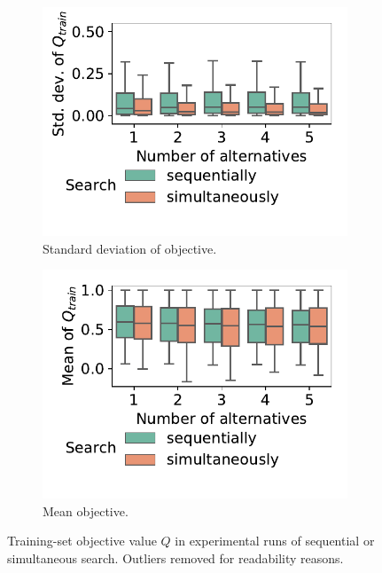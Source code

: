 \documentclass{article}
\theoremstyle{definition}
\begin{document}
\begin{figure}[htb]
	\centering
	\begin{subfigure}{0.48\textwidth}
		\centering
		\includegraphics[width=\textwidth]{plots/impact-search-stddev-objective.pdf}
		\caption{Standard deviation of objective.}
		\label{fig:impact-search-stddev-objective}
	\end{subfigure}
	\hfill
	\begin{subfigure}{0.48\textwidth}
		\centering
		\includegraphics[width=\textwidth]{plots/impact-search-mean-objective.pdf}
		\caption{Mean objective.}
		\label{fig:impact-search-mean-objective}
	\end{subfigure}
	\caption{Training-set objective value $Q$ in experimental runs of sequential or simultaneous search.
	Outliers removed for readability reasons.}
	\label{fig:impact-search-objective}
\end{figure}
\end{document}
